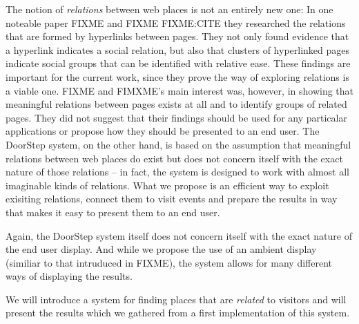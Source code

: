\documentclass[a4paper]{danarticle}
\theoremstyle{remark}
\begin{document}
    The notion of \emph{relations} between web places is not an entirely new 
    one: In one noteable paper FIXME and FIXME FIXME:CITE they researched the 
    relations that are formed by hyperlinks between pages. They not only found 
    evidence that a hyperlink indicates a social relation, but also that 
    clusters of hyperlinked pages indicate social groups that can be identified 
    with relative ease. These findings are important for the current work, 
    since they prove the way of exploring relations is a viable one. FIXME and 
    FIMXME's main interest was, however, in showing that meaningful relations 
    between pages exists at all and to identify groups of related pages. They 
    did not suggest that their findings should be used for any particalar 
    applications or propose how they should be presented to an end user. The 
    DoorStep system, on the other hand, is based on the assumption that 
    meaningful relations between web places do exist but does not concern itself 
    with the exact nature of those relations -- in fact, the system is designed 
    to work with almost all imaginable kinds of relations. What we propose is an 
    efficient way to exploit exisiting relations, connect them to visit events 
    and prepare the results in way that makes it easy to present them to an end 
    user.
    
    Again, the DoorStep system itself does not concern itself with the exact 
    nature of the end user display. And while we propose the use of an ambient 
    display (similiar to that intruduced in FIXME), the system allows for many 
    different ways of displaying the results.
    
    We will introduce a system for finding places that are \textit{related} to
    visitors and will present the results which we gathered from a first
    implementation of this system.
\end{document}
